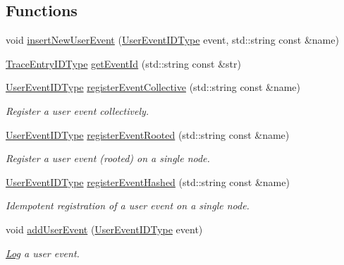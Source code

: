 \subsection*{Functions}
\begin{DoxyCompactItemize}
\item 
void \hyperlink{namespacevt_1_1trace_acbaabde4144cf5291fcc65983e7dc7a0}{insert\+New\+User\+Event} (\hyperlink{namespacevt_1_1trace_a5908920d051c144c89f17c69ed262350}{User\+Event\+I\+D\+Type} event, std\+::string const \&name)
\item 
\hyperlink{namespacevt_1_1trace_a3c14050715ba9eceaeff51fb3de64f2f}{Trace\+Entry\+I\+D\+Type} \hyperlink{namespacevt_1_1trace_ac7c4c6c55b38e5c03f0e541946bcf375}{get\+Event\+Id} (std\+::string const \&str)
\item 
\hyperlink{namespacevt_1_1trace_a5908920d051c144c89f17c69ed262350}{User\+Event\+I\+D\+Type} \hyperlink{namespacevt_1_1trace_ab52bad26cd57cc6e59953c814192b0f1}{register\+Event\+Collective} (std\+::string const  \&name)
\begin{DoxyCompactList}\small\item\em Register a user event collectively. \end{DoxyCompactList}\item 
\hyperlink{namespacevt_1_1trace_a5908920d051c144c89f17c69ed262350}{User\+Event\+I\+D\+Type} \hyperlink{namespacevt_1_1trace_a0cacc6989895f36e577db51e16df1e23}{register\+Event\+Rooted} (std\+::string const  \&name)
\begin{DoxyCompactList}\small\item\em Register a user event (rooted) on a single node. \end{DoxyCompactList}\item 
\hyperlink{namespacevt_1_1trace_a5908920d051c144c89f17c69ed262350}{User\+Event\+I\+D\+Type} \hyperlink{namespacevt_1_1trace_ad1f604656798749839b36d1d29def59e}{register\+Event\+Hashed} (std\+::string const  \&name)
\begin{DoxyCompactList}\small\item\em Idempotent registration of a user event on a single node. \end{DoxyCompactList}\item 
void \hyperlink{namespacevt_1_1trace_ac973a9573bd3cc0a3fead674a4551ac5}{add\+User\+Event} (\hyperlink{namespacevt_1_1trace_a5908920d051c144c89f17c69ed262350}{User\+Event\+I\+D\+Type} event)
\begin{DoxyCompactList}\small\item\em \hyperlink{structvt_1_1trace_1_1_log}{Log} a user event. \end{DoxyCompactList}\item 

\end{DoxyCompactItemize}
